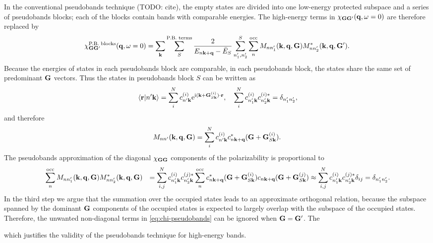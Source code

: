 \documentclass[hyperref, a4paper]{article}
\newcommand*{\ii}{\mathrm{i}}
\newcommand*{\ee}{\mathrm{e}}
\def\\{}%
\begin{document}
In the conventional pseudobands technique (TODO: cite), 
the empty states are divided into one low-energy protected subspace 
and a series of pseudobands blocks; 
each of the blocks contain bands with comparable energies.
The high-energy terms in $\chi_{\vb{G} \vb{G}'}(\vb{q}, \omega = 0)$ are therefore replaced by  
\begin{equation}
    \chi^{\text{P.B. blocks}}_{\vb{G} \vb{G}'}(\vb{q}, \omega = 0)
    = \sum_{\vb{k}}  \sum_{S}^{\text{P.B. terms}} \frac{
        2
    }{
        E_{n \vb{k} + \vb{q}} - \bar{E}_S 
    } 
    \sum_{n_1', n_2'}^{S} \sum_{n}^{\text{occ}}
    M_{n n'_1} (\vb{k}, \vb{q}, \vb{G}) M^*_{nn'_2} (\vb{k}, \vb{q}, \vb{G}') .
    \label{eq:chi-pseudobands}
\end{equation}
Because the energies of states in each pseudobands block are comparable, 
in each pseudobands block, the states share the same set of predominant $\vb{G}$ vectors.
Thus the states in pseudobands block $S$ can be written as 
\begin{equation}
    \braket*{\vb{r}}{n' \vb{k}} =  \sum_i^N 
    c_{n' \vb{k}}^{(i)} \ee^{\ii (\vb{k} + \vb{G}^{(i)}_{S \vb{k}}) \cdot \vb{r}}, \quad 
    \sum_{i}^{N} c^{(i)}_{n'_1 \vb{k}} c^{(i)*}_{n'_2 \vb{k}} = \delta_{n'_1 n'_2},
\end{equation}
and therefore 
\begin{equation}
    M_{nn'}(\vb{k}, \vb{q}, \vb{G}) = \sum_{i}^{N} c_{n' \vb{k}}^{(i)} c_{n \vb{k} + \vb{q}}^*(\vb{G} + \vb{G}_{S \vb{k}}^{(i)}).
\end{equation}
The pseudobands approximation of the diagonal $\chi_{\vb{G} \vb{G}}$ components of the polarizability is proportional to 
\begin{equation}
    \begin{aligned}
    &\quad \sum_n^{\text{occ}} M_{n n'_1} (\vb{k}, \vb{q}, \vb{G}) M^*_{n n'_2} (\vb{k}, \vb{q}, \vb{G}) \\
    &= \sum_{i , j}^N 
    c^{(i)}_{n'_1 \vb{k}} c^{(j) *}_{n'_2 \vb{k}}
    \sum_{n}^{\text{occ}} 
    c_{n \vb{k} + \vb{q}}^*(\vb{G} + \vb{G}^{(i)}_{S \vb{k}})
    c_{n \vb{k} + \vb{q}}  (\vb{G} + \vb{G}^{(j)}_{S \vb{k}}) \\
    &\approx \sum_{i , j}^N  c^{(i)}_{n'_1 \vb{k}} c^{(j) *}_{n'_2 \vb{k}} \delta_{ij} = \delta_{n_1' n_2'}.
    \end{aligned}
\end{equation}
In the third step we argue that the summation over the occupied states leads to an approximate orthogonal relation,
because the subspace spanned by the dominant $\vb{G}$ components of the occupied states 
is expected to largely overlap with the subspace of the occupied states.
Therefore, the unwanted non-diagonal terms in \eqref{eq:chi-pseudobands} can be ignored when $\vb{G} = \vb{G}'$.
The 

which justifies the validity of the pseudobands technique for high-energy bands.
\end{document}
